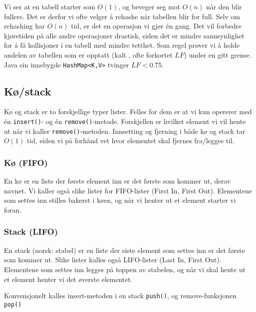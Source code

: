 Vi ser at en tabell starter som $ O(1) $, og beveger seg mot $ O(n) $ når den blir fullere. Det er derfor vi ofte velger å rehashe når tabellen blir for full. Selv om rehashing har $ O(n) $ tid, er det en operasjon vi gjør én gang. Det vil forbedre kjøretiden på alle andre operasjoner drastisk, siden det er mindre sannsynlighet for å få kollisjoner i en tabell med mindre tetthet. Som regel prøver vi å holde andelen av tabellen som er opptatt (kalt , ofte forkortet $ LF $) under en gitt grense. Java sin innebygde \verb|HashMap<K,V>| tvinger $ LF < 0.75 $.





\subsection{Kø/stack} \label{ko_stack}
Kø og stack er to forskjellige typer lister. Felles for dem er at vi kun opererer med én \verb|insert()|- og én \verb|remove()|-metode. Forskjellen er hvilket element vi vil hente ut når vi kaller \verb|remove()|-metoden. Innsetting og fjerning i både kø og stack tar $ O(1) $ tid, siden vi på forhånd vet hvor elementet skal fjernes fra/legges til. 


\subsubsection{Kø (FIFO)}
En kø er en liste der første element inn er det første som kommer ut, derav navnet. Vi kaller også slike lister for FIFO-lister (First In, First Out). Elementene som settes inn stilles bakerst i køen, og når vi henter ut et element starter vi foran. 


\subsubsection{Stack (LIFO)}
En stack (norsk: stabel) er en liste der siste element som settes inn er det første som kommer ut. Slike lister kalles også LIFO-lister (Last In, First Out). Elementene som settes inn legges på toppen av stabelen, og når vi skal hente ut et element henter vi det øverste elementet. 

Konvensjonelt kalles insert-metoden i en stack \verb|push()|, og remove-funksjonen \verb|pop()|

